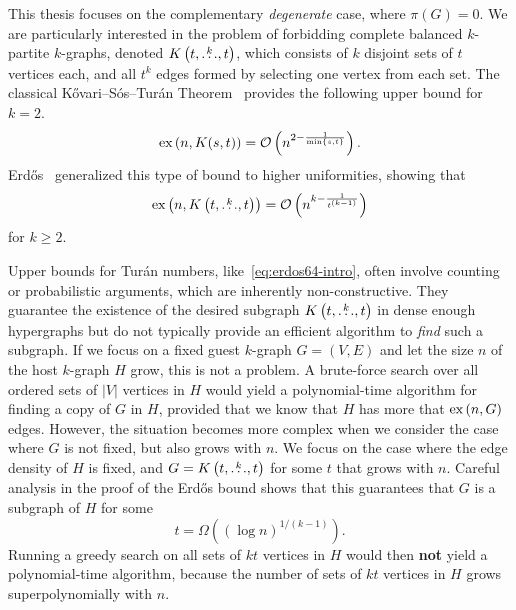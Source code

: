 This thesis focuses on the complementary \emph{degenerate} case, where $\pi(G) = 0$.
We are particularly interested in the problem of forbidding complete balanced $k$-partite $k$-graphs,
denoted $K\left(t, \overset{k}{\dots}, t\right)$, which consists of $k$ disjoint sets of $t$ vertices each,
and all $t^k$ edges formed by selecting one vertex from each set.
The classical Kővari--Sós--Turán Theorem~\cite{Kovari1954, Hylten1958}
provides the following upper bound for $k=2$.
\[
    \text{ex} \left( n, K(s, t) \right) = \mathcal{O}\left(n^{2 - \frac{1}{\min\{s, t\}}}\right).
\]
Erdős~\cite{Erods1964} generalized this type of bound to higher uniformities,
showing that
\begin{equation} \label{eq:erdos64-intro}
    \text{ex} \left( n, K\left(t, \overset{k}{\dots}, t\right) \right) = \mathcal{O}\left(n^{k - \frac{1}{t^{(k-1)}}}\right)
\end{equation}
for $k \ge 2$.

Upper bounds for Turán numbers, like~\eqref{eq:erdos64-intro},
often involve counting or probabilistic arguments,
which are inherently non-constructive.
They guarantee the existence of the desired subgraph $K\left(t, \overset{k}{\dots}, t\right)$
in dense enough hypergraphs but do not typically provide an efficient algorithm to \emph{find} such a subgraph.
If we focus on a fixed guest $k$-graph $G = (V, E)$ and let the size $n$ of the host $k$-graph $H$ grow,
this is not a problem.
A brute-force search over all ordered sets of $|V|$ vertices in $H$ would yield a polynomial-time algorithm
for finding a copy of $G$ in $H$, provided that we know that $H$ has more that $\text{ex} \left( n, G \right)$ edges.
However, the situation becomes more complex when we consider the case where $G$ is not fixed, but also grows with $n$.
We focus on the case where the edge density of $H$ is fixed, and $G = K\left(t, \overset{k}{\dots}, t\right)$ for some $t$ that grows with $n$.
Careful analysis in the proof of the Erdős bound shows that this guarantees that $G$ is a subgraph of $H$ for some
\begin{equation} \label{eq:t-lower-intro}
    t = \Omega\left( (\log n)^{1/(k-1) }\right).
\end{equation}
Running a greedy search on all sets of $kt$ vertices in $H$ would then \textbf{not} yield a polynomial-time algorithm,
because the number of sets of $kt$ vertices in $H$ grows superpolynomially with $n$.


